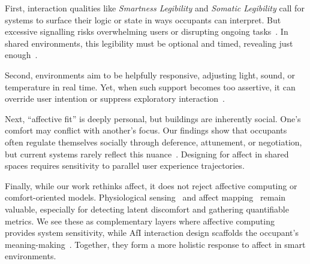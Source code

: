 First, interaction qualities like \textit{Smartness Legibility} and \textit{Somatic Legibility} call for systems to surface their logic or state in ways occupants can interpret. But excessive signalling risks overwhelming users or disrupting ongoing tasks~\cite{case2015calm}. In shared environments, this legibility must be optional and timed, revealing just enough~\cite{mccarthy2004technology}.

Second, environments aim to be helpfully responsive, adjusting light, sound, or temperature in real time. Yet, when such support becomes too assertive, it can override user intention or suppress exploratory interaction~\cite{gaver2003ambiguity}. 

Next, ``affective fit'' is deeply personal, but buildings are inherently social. One's comfort may conflict with another’s focus. Our findings show that occupants often regulate themselves socially through deference, attunement, or negotiation, but current systems rarely reflect this nuance~\cite{erickson2000social, tolmie2002unremarkable, van2009social}. Designing for affect in shared spaces requires sensitivity to parallel user experience trajectories.

Finally, while our work rethinks affect, it does not reject affective computing or comfort-oriented models. Physiological sensing~\cite{picard1999affective} and affect mapping~\cite{russell1980circumplex} remain valuable, especially for detecting latent discomfort and gathering quantifiable metrics. We see these as complementary layers where affective computing provides system sensitivity, while AfI interaction design scaffolds the occupant’s meaning-making~\cite{mccarthy2004technology, hook2018designing}. Together, they form a more holistic response to affect in smart environments.


